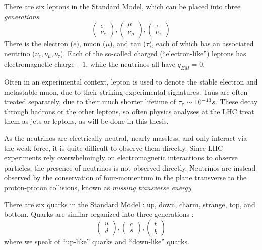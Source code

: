 There are six leptons in the Standard Model, which can be placed into three \textit{generations}.
\begin{equation}
\begin{pmatrix} e \\ \nu_e \end{pmatrix} , \begin{pmatrix} \mu \\ \nu_\mu \end{pmatrix}, \begin{pmatrix} \tau \\ \nu_\tau \end{pmatrix}
\end{equation}
There is the electron ($e)$, muon ($\mu$), and tau ($\tau$), each of which has an associated neutrino ($\nu_e, \nu_\mu, \nu_\tau$).
Each of the so-called charged (``electron-like'') leptons has electromagnetic charge $-1$, while the neutrinos all have $q_{EM} = 0$.

Often in an experimental context, lepton is used to denote the stable electron and metastable muon, due to their striking experimental signatures.
Taus are often treated separately, due to their much shorter lifetime of $\tau_{\tau} \sim 10^{-13} s$.
These decay through hadrons or the other leptons, so often physics analyses at the LHC treat them as jets or leptons, as will be done in this thesis.

As the neutrinos are electrically neutral, nearly massless, and only interact via the weak force, it is quite difficult to observe them directly.
Since LHC experiments rely overwhelmingly on electromagnetic interactions to observe particles, the presence of neutrinos is not observed directly.
Neutrinos are instead observed by the conservation of four-momentum in the plane transverse to the proton-proton collisions, known as \textit{missing transverse energy}.

There are six quarks in the Standard Model : up, down, charm, strange, top, and bottom.
Quarks are similar organized into three generations :
\begin{equation}
\begin{pmatrix} u \\ d \end{pmatrix} , \begin{pmatrix} c \\ s \end{pmatrix}, \begin{pmatrix} t \\ b \end{pmatrix}
\end{equation}
where we speak of ``up-like'' quarks and ``down-like'' quarks.

